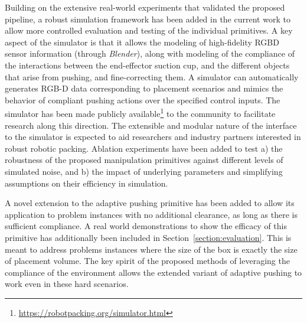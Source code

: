 {%

Building on the extensive real-world experiments that validated the proposed pipeline, a robust simulation framework has been added in the current work to allow more controlled evaluation and testing of the individual primitives. A key aspect of the simulator is that it allows the modeling of high-fidelity RGBD sensor information (through \textit{Blender}), along with modeling of the compliance of the interactions between the end-effector suction cup, and the different objects that arise from pushing, and fine-correcting them. A simulator can automatically generates RGB-D data corresponding to placement scenarios and mimics the behavior of compliant pushing actions over the specified control inputs. The simulator has been made publicly available\footnote{\url{https://robotpacking.org/simulator.html}} to the community to facilitate research along this direction. The extensible and modular nature of the interface to the simulator is expected to aid researchers and industry partners interested in robust robotic packing. Ablation experiments have been added to test a) the robustness of the proposed manipulation primitives against different levels of simulated noise, and b) the impact of underlying parameters and simplifying assumptions on their efficiency in simulation.

A novel extension to the adaptive pushing primitive has been added to allow its application to problem instances with no additional clearance, as long as there is sufficient compliance. A real world demonstrations to show the efficacy of this primitive has additionally been included in Section~\ref{section:evaluation}. This is meant to address problems instances where the size of the box is exactly the size of placement volume. The key spirit of the proposed methods of leveraging the compliance of the environment allows the extended variant of adaptive pushing to work even in these hard scenarios.

}
